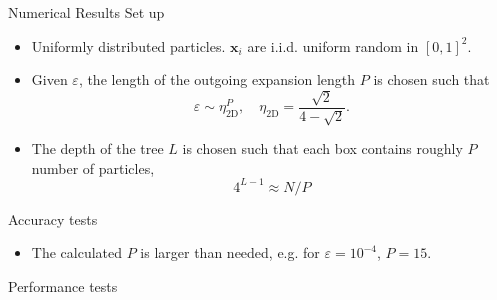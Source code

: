 \documentclass[hangout,aspectratio=1610,10pt]{beamer}
\newcommand{\bs}[1]{\textbf{#1}}
\begin{document}
\begin{frame}{Numerical Results}
\alert{Set up}
\begin{itemize}
\item Uniformly distributed particles. $\bs x_i$ are i.i.d. uniform random in $[0,1]^2$.
\item Given $\varepsilon$, the length of the outgoing expansion length $P$ is chosen such that 
\begin{equation*}
    \label{eq:P}
    \varepsilon\sim\eta_{\text{2D}}^P, \quad \eta_{\text{2D}}=\frac{\sqrt{2}}{4-\sqrt{2}}.
\end{equation*}
\item The depth of the tree $L$ is chosen such that each box contains roughly $P$ number of particles, \begin{equation*}
    4^{L-1} \approx N/P
\end{equation*}
\end{itemize}
\end{frame}
\begin{frame}{Accuracy tests}
\begin{figure}[ht] 
  \centering
  
  \label{fig:fmm}
\end{figure} 
\begin{itemize}
    \item The calculated $P$ is larger than needed, e.g. for $\varepsilon=10^{-4}$, $P=15$.
\end{itemize}
\end{frame}
\begin{frame}{Performance tests}
\end{frame}
\end{document}
